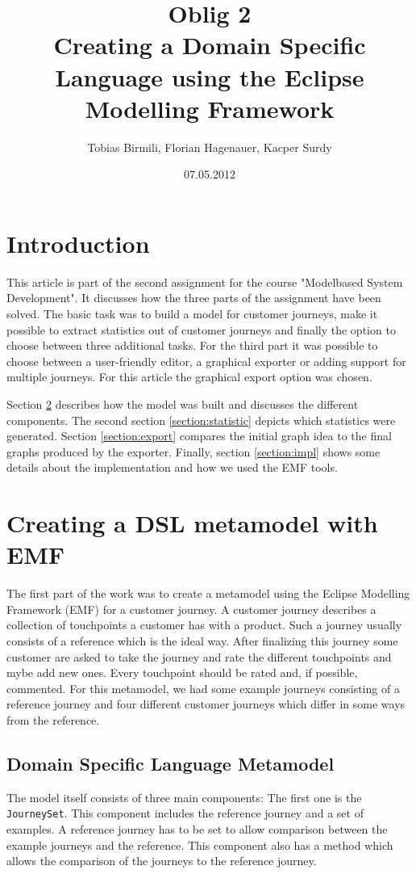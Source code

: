 \documentclass[12pt]{scrartcl}
\title{Oblig 2 \\ Creating a Domain Specific Language using the Eclipse Modelling Framework}
\author{Tobias Birmili, Florian Hagenauer, Kacper Surdy}
\date{07.05.2012}
\begin{document}
\maketitle

\tableofcontents

\section{Introduction}

This article is part of the second assignment for the course "Modelbased System Development". It discusses
how the three parts of the assignment have been solved. The basic task was to build a model for customer journeys,
make it possible to extract statistics out of customer journeys and finally the option to choose between three
additional tasks. For the third part it was possible to choose between a user-friendly editor, a graphical exporter
or adding support for multiple journeys. For this article the graphical export option was chosen.

Section \ref{section:model} describes how the model was built and discusses the different components. The second
section \ref{section:statistic} depicts which statistics were generated. Section \ref{section:export}
compares the initial graph idea to the final graphs produced by the exporter. Finally, section \ref{section:impl} shows
some details about the implementation and how we used the EMF tools.

\section{Creating a DSL metamodel with EMF} 
\label{section:model}

The first part of the work was to create a metamodel using the Eclipse Modelling Framework (EMF) for a customer
journey. A customer journey describes a collection of touchpoints a customer has with a product. Such a journey
usually consists of a reference which is the ideal way. After finalizing this journey some customer are asked
to take the journey and rate the different touchpoints and mybe add new ones. Every touchpoint should be rated
and, if possible, commented. For this metamodel, we had some example journeys consisting of a reference journey and four
different customer journeys which differ in some ways from the reference. 

\subsection{Domain Specific Language Metamodel}
The model itself consists of three main components: The first one is the \lstinline!JourneySet!. This component
includes the reference journey and a set of examples. A reference journey has to be set to allow comparison
between the example journeys and the reference. This component also has a method which allows the comparison
of the journeys to the reference journey. 
\end{document}
